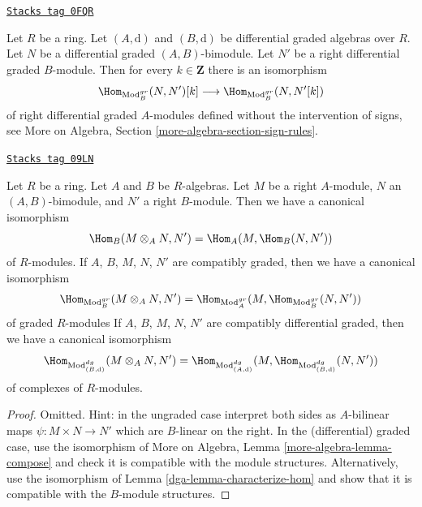 \begin{remark}
\label{dga-remark-shift-hom-no-sign}
\href{https://stacks.math.columbia.edu/tag/0FQR}{\texttt{Stacks tag 0FQR}}

Let $R$ be a ring. Let $(A, \text{d})$ and $(B, \text{d})$
be differential graded algebras over $R$. Let $N$ be a
differential graded $(A, B)$-bimodule. Let $N'$ be a right differential
graded $B$-module. Then for every $k \in \mathbf{Z}$ there
is an isomorphism
$$
\Hom_{\text{Mod}^{gr}_B}(N, N')[k]
\longrightarrow
\Hom_{\text{Mod}^{gr}_B}(N, N'[k])
$$
of right differential graded $A$-modules defined without the intervention
of signs, see More on Algebra, Section \ref{more-algebra-section-sign-rules}.
\end{remark}

\begin{lemma}
\label{dga-lemma-tensor-hom-adjunction}
\href{https://stacks.math.columbia.edu/tag/09LN}{\texttt{Stacks tag 09LN}}

Let $R$ be a ring. Let $A$ and $B$ be $R$-algebras.
Let $M$ be a right $A$-module, $N$ an $(A, B)$-bimodule, and
$N'$ a right $B$-module. Then we have a canonical isomorphism
$$
\Hom_B(M \otimes_A N, N') = \Hom_A(M, \Hom_B(N, N'))
$$
of $R$-modules.
If $A$, $B$, $M$, $N$, $N'$ are compatibly graded, then we have a
canonical isomorphism
$$
\Hom_{\text{Mod}_B^{gr}}(M \otimes_A N, N') =
\Hom_{\text{Mod}_A^{gr}}(M, \Hom_{\text{Mod}_B^{gr}}(N, N'))
$$
of graded $R$-modules
If $A$, $B$, $M$, $N$, $N'$ are compatibly differential graded, then
we have a canonical isomorphism
$$
\Hom_{\text{Mod}^{dg}_{(B, \text{d})}}(M \otimes_A N, N') =
\Hom_{\text{Mod}^{dg}_{(A, \text{d})}}(M,
\Hom_{\text{Mod}^{dg}_{(B, \text{d})}}(N, N'))
$$
of complexes of $R$-modules.
\end{lemma}

\begin{proof}

Omitted. Hint: in the ungraded case interpret both sides as $A$-bilinear maps
$\psi : M \times N \to N'$ which are $B$-linear on the right.
In the (differential) graded case, use the isomorphism of
More on Algebra, Lemma \ref{more-algebra-lemma-compose}
and check it is compatible with the module structures.
Alternatively, use the isomorphism of Lemma \ref{dga-lemma-characterize-hom}
and show that it is compatible with the $B$-module structures.
\end{proof}

